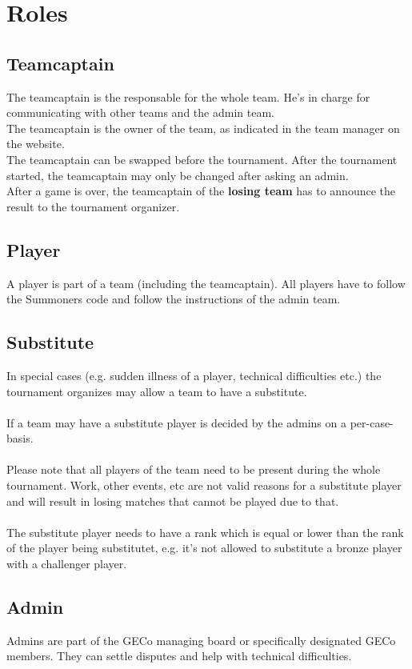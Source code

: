 \documentclass{article}
\begin{document}
\section{Roles}
\subsection{Teamcaptain}
The teamcaptain is the responsable for the whole team. He's in charge for communicating with other teams and the admin team.
\\
The teamcaptain is the owner of the team, as indicated in the team manager on the website. 
\\
The teamcaptain can be swapped before the tournament. After the tournament started, the teamcaptain may only be changed after asking an admin.
\\
After a game is over, the teamcaptain of the \textbf{losing team} has to announce the result to the tournament organizer.

\subsection{Player}
A player is part of a team (including the teamcaptain). All players have to follow the Summoners code and follow the instructions of the admin team.

\subsection{Substitute}
In special cases (e.g. sudden illness of a player, technical difficulties etc.) the tournament organizes may allow a team to have a substitute.
\\
\\
If a team may have a substitute player is decided by the admins on a per-case-basis.
\\
\\
Please note that all players of the team need to be present during the whole tournament. Work, other events, etc are not valid reasons for a substitute player and will result in losing matches that cannot be played due to that.
\\
\\
The substitute player needs to have a rank which is equal or lower than the rank of the player being substitutet, e.g. it's not allowed to substitute a bronze player with a challenger player.

\subsection{Admin}
Admins are part of the GECo managing board or specifically designated GECo members. They can settle disputes and help with technical difficulties.
\end{document}
